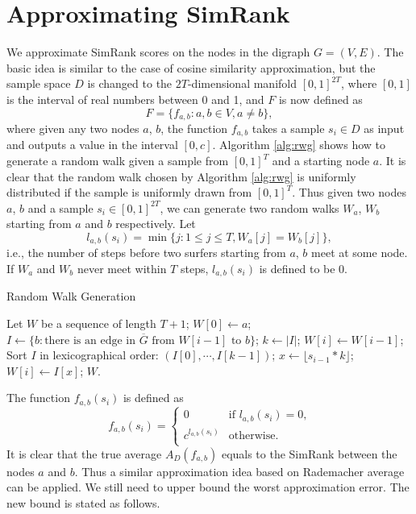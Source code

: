 \documentclass{article}
\begin{document}
\section{Approximating SimRank}
We approximate SimRank scores on the nodes in the digraph $G=(V,E)$. 
The basic idea is similar to the case of cosine similarity approximation, but the sample space $D$ is changed to the $2T$-dimensional manifold $[0,1]^{2T}$, where $[0,1]$ is the interval of real numbers between 0 and 1, and $F$ is now defined as
$$F = \{f_{a,b} : a,b\in V, a\not= b\},$$
where given any two nodes $a$, $b$, the function $f_{a,b}$ takes a sample $s_i\in D$ as input and outputs a value in the interval $[0,c]$. Algorithm \ref{alg:rwg} shows how to generate a random walk given a sample from $[0,1]^T$ and a starting node $a$. It is clear that the random walk chosen by Algorithm \ref{alg:rwg} is uniformly distributed if the sample is uniformly drawn from $[0,1]^T$. Thus given two nodes $a$, $b$ and a sample $s_i \in [0,1]^{2T}$, we can generate two random walks $W_a$, $W_b$ starting from $a$ and $b$ respectively. Let 
$$l_{a,b}(s_i) = \min\{j: 1\leq j\leq T, W_a[j] = W_b[j]\},$$
i.e., the number of steps before two surfers starting from $a$, $b$ meet at some node. If $W_a$ and $W_b$ never meet within $T$ steps, $l_{a,b}(s_i)$ is defined to be 0.

\begin{algorithm}[!t]
\caption{\textsf{Random Walk Generation}}
\label{alg:rwg}
\renewcommand{\algorithmicrequire}{\textbf{Input:}}
\renewcommand{\algorithmicensure}{\textbf{Output:}}
\begin{algorithmic}
\State Let $W$ be a sequence of length $T+1$;
\State $W[0] \gets a$;
	\State $I \gets \{b: \textrm{there is an edge in $\overline{G}$ from $W[i-1]$ to $b$}\}$;
	\State $k \gets |I|$;
		\State $W[i] \gets W[i-1]$;
	\Else
		\State Sort $I$ in lexicographical order: $(I[0],\cdots,I[k-1])$;
		\State $x \gets \lfloor s_{i-1} * k \rfloor$;
		\State $W[i] \gets I[x]$;
	\EndIf
\EndFor
{} $W$.
\end{algorithmic}
\end{algorithm}

The function $f_{a,b}(s_i)$ is defined as 
$$f_{a,b}(s_i) =\begin{cases}
0 & \textrm{if $l_{a,b}(s_i)=0$,} \\
c^{l_{a,b}(s_i)} & \textrm{otherwise}.\\
\end{cases}$$
It is clear that the true average $A_D(f_{a,b})$ equals to the SimRank between the nodes $a$ and $b$. Thus a similar approximation idea based on Rademacher average can be applied. We still need to upper bound the worst approximation error. The new bound is stated as follows.
\end{document}
